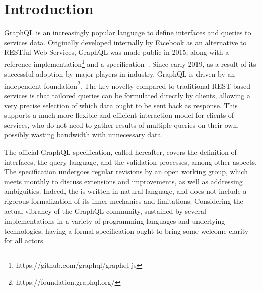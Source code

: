 \section{Introduction}


GraphQL is an increasingly popular language to define interfaces and queries to services data. Originally developed internally by Facebook as an alternative to RESTful Web Services, GraphQL was made public in 2015, along with a reference implementation\footnote{https://github.com/graphql/graphql-js} and a specification~\cite{gqlspec}. Since early 2019, as a result of its successful adoption by major players in industry,
GraphQL is driven by an independent foundation\footnote{https://foundation.graphql.org/}. The key novelty compared to traditional REST-based services is that tailored queries can be formulated directly by clients, allowing a very precise selection of which data ought to be sent back as response. This supports a much more flexible and efficient interaction model for clients of services, who do not need to gather results of multiple queries on their own, possibly wasting bandwidth with unnecessary data.


The official GraphQL specification, called \spec{} hereafter, 
covers the definition of interfaces, the query language, and the validation processes, among other aspects. The specification undergoes regular revisions by an open working group, which meets monthly to discuss extensions and improvements, as well as addressing ambiguities. Indeed, the \spec{} is written in natural language, and does not include a rigorous formalization of  its inner mechanics and limitations.
Considering the actual vibrancy of the GraphQL community, sustained by several implementations in a variety of programming languages and underlying technologies, having a formal specification ought to bring some welcome clarity for all actors.

